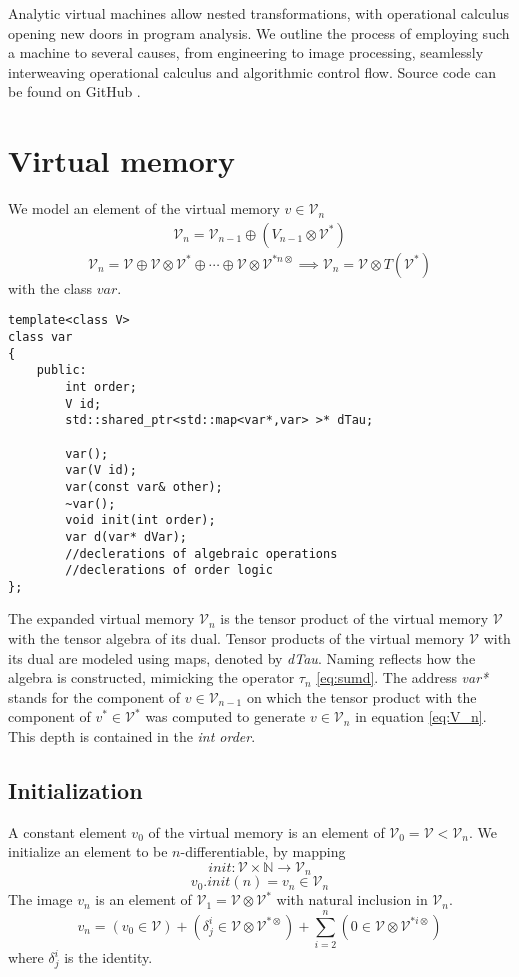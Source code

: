 \documentclass{article}
\newcommand{\VV}{\mathcal{V}}
\newcommand{\sumd}{\tau}
\begin{document}
Analytic virtual machines allow nested transformations, with operational calculus opening new doors in program analysis. We outline the process of employing such a machine to several causes, from engineering to image processing, seamlessly interweaving operational calculus and algorithmic control flow. Source code can be found on GitHub \cite{dCpp}.

\section{Virtual memory}\label{sec:virtualMemory}

We model an element of the virtual memory $v\in\VV_n$ \cite[Claim~4.1]{OperationalCalculus}
\begin{eqnarray}
\VV_{n}=\VV_{n-1}\oplus(V_{n-1}\otimes\VV^*) \label{eq:V_n}
\end{eqnarray}
\begin{equation}
\VV_{n}=\VV\oplus\VV\otimes\VV^*\oplus\cdots\oplus\VV\otimes\VV^{*n\otimes} \implies\VV_n=\VV\otimes T(\VV^*)
\end{equation}
with the class $var$.

\begin{lstlisting}
template<class V>
class var
{
    public:
    	int order;
        V id;
        std::shared_ptr<std::map<var*,var> >* dTau;

        var();
        var(V id);
        var(const var& other);
        ~var();
        void init(int order);
        var d(var* dVar);
        //declerations of algebraic operations
        //declerations of order logic
};
\end{lstlisting}

The expanded virtual memory $\VV_n$ is the tensor product of the virtual memory $\VV$ with the tensor algebra of its dual. Tensor products of the virtual memory $\VV$ with its dual are modeled using maps, denoted by \emph{dTau}. Naming reflects how the algebra is constructed, mimicking the operator $\sumd_n$ \eqref{eq:sumd}. The address \emph{var*} stands for the component of $v\in\VV_{n-1}$ on which the tensor product with the component of $v^*\in\VV^*$ was computed to generate $v\in\VV_n$ in equation \eqref{eq:V_n}. This depth is contained in the \emph{int order}.

\subsection{Initialization}

A constant element $v_0$ of the virtual memory is an element of $\VV_0=\VV<\VV_n$. We initialize an element to be $n$-differentiable, by mapping
\begin{equation}
init:\VV\times\mathbb{N}\to\VV_n
\end{equation}
\begin{equation}
v_0.init(n)=v_n\in\VV_n
\end{equation}
The image $v_n$ is an element of $\VV_1=\VV\otimes\VV^*$ with natural inclusion in $\VV_n$.
\begin{equation}
v_n=(v_0\in\VV)+(\delta^i_j\in\VV\otimes\VV^ {*\otimes})+\sum\limits_{i=2}^n(0\in\VV\otimes\VV^ {*i\otimes})
\end{equation}
where $\delta^i_j$ is the identity.
\end{document}
